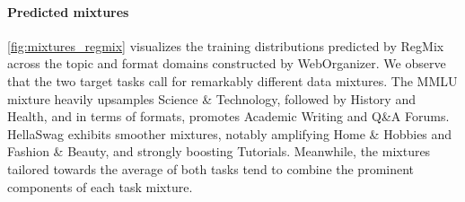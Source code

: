 \paragraph{Predicted mixtures}
\autoref{fig:mixtures_regmix} visualizes the training distributions predicted by RegMix across the topic and format domains constructed by WebOrganizer.
We observe that the two target tasks call for remarkably different data mixtures.
The MMLU mixture heavily upsamples {\atopic Science \& Technology}, followed by {\atopic History} and {\atopic Health}, and in terms of formats, promotes {\aformat Academic Writing} and {\aformat Q\&A Forums}.
HellaSwag exhibits smoother mixtures, notably amplifying {\atopic Home \& Hobbies} and {\atopic Fashion \& Beauty}, and strongly boosting {\aformat Tutorials}.
Meanwhile, the mixtures tailored towards the average of both tasks tend to combine the prominent components of each task mixture.

